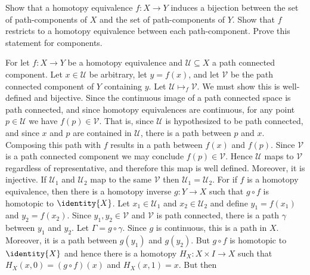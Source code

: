 \documentclass{book}                                                           %
\begin{document}
        \begin{problem}
            Show that a homotopy equivalence $f:X\rightarrow{Y}$ induces a bijection
            between the set of path-components of $X$ and the set of path-components
            of $Y$. Show that $f$ restricts to a homotopy equivalence between each
            path-component. Prove this statement for components.
        \end{problem}
        \begin{solution}
            For let $f:X\rightarrow{Y}$ be a homotopy equivalence and
            $\mathcal{U}\subseteq{X}$ a path connected component. Let
            $x\in\mathcal{U}$ be arbitrary, let $y=f(x)$, and let $\mathcal{V}$ be
            the path connected component of $Y$ containing $y$. Let
            $\mathcal{U}\mapsto_{f}\mathcal{V}$. We must show this is well-defined
            and bijective. Since the continuous image of a path connected space is
            path connected, and since homotopy equivalences are continuous, for any
            point $p\in\mathcal{U}$ we have $f(p)\in\mathcal{V}$. That is, since
            $\mathcal{U}$ is hypothesized to be path connected, and since $x$ and
            $p$ are contained in $\mathcal{U}$, there is a path between $p$ and $x$.
            Composing this path with $f$ results in a path between $f(x)$ and
            $f(p)$. Since $\mathcal{V}$ is a path connected component we may
            conclude $f(p)\in\mathcal{V}$. Hence $\mathcal{U}$ maps to $\mathcal{V}$
            regardless of representative, and therefore this map is well defined.
            Moreover, it is injective. If
            $\mathcal{U}_{1}$ and $\mathcal{U}_{2}$ map to the same $\mathcal{V}$
            then $\mathcal{U}_{1}=\mathcal{U}_{2}$. For if $f$ is a homotopy
            equivalence, then there is a homotopy inverse $g:Y\rightarrow{X}$ such
            that $g\circ{f}$ is homotopic to $\identity{X}$. Let
            $x_{1}\in\mathcal{U}_{1}$ and $x_{2}\in\mathcal{U}_{2}$ and define
            $y_{1}=f(x_{1})$ and $y_{2}=f(x_{2})$. Since $y_{1},y_{2}\in\mathcal{V}$
            and $\mathcal{V}$ is path connected, there is a path $\gamma$ between
            $y_{1}$ and $y_{2}$. Let $\Gamma=g\circ\gamma$. Since $g$ is continuous,
            this is a path in $X$. Moreover, it is a path between $g(y_{1})$ and
            $g(y_{2})$. But $g\circ{f}$ is homotopic to $\identity{X}$
            and hence there is a homotopy $H_{X}:X\times{I}\rightarrow{X}$ such that
            $H_{X}(x,0)=(g\circ{f})(x)$ and $H_{X}(x,1)=x$. But then

\end{solution}
\end{document}
